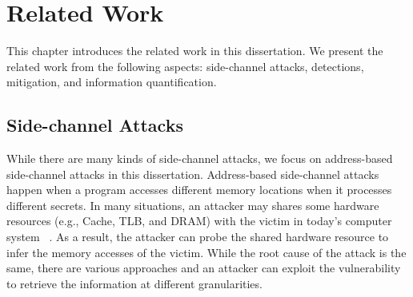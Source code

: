 
\chapter{Related Work}\label{chapter2}
This chapter introduces the related work in this dissertation. We present the related work from the following aspects: side-channel attacks, detections, mitigation, and information quantification.

\section{Side-channel Attacks}
While there are many kinds of side-channel attacks, we focus on address-based side-channel attacks in this dissertation.
Address-based side-channel attacks happen when a program accesses different memory locations when it processes different secrets. In many situations, an attacker may shares some hardware resources (e.g., Cache, TLB, and DRAM) with the victim in today's computer system ~\cite{ge2018survey,szefer2019survey}. As a result, the attacker can probe the shared hardware resource to infer the memory accesses of the victim. While the root cause of the attack is the same, there are various approaches and an attacker can exploit the vulnerability to retrieve the information at different granularities. 

